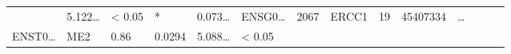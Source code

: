 \documentclass[
]{article}
\begin{document}
\begin{longtable}[]{@{}llllllllllllll@{}}
\begin{minipage}[t]{0.04\columnwidth}
\end{minipage} & \begin{minipage}[t]{0.05\columnwidth}\raggedright
5.122\ldots{}\strut
\end{minipage} & \begin{minipage}[t]{0.05\columnwidth}\raggedright
\textless{} 0.05\strut
\end{minipage} & \begin{minipage}[t]{0.03\columnwidth}\raggedright
*\strut
\end{minipage} & \begin{minipage}[t]{0.05\columnwidth}\raggedright
0.073\ldots{}\strut
\end{minipage} & \begin{minipage}[t]{0.05\columnwidth}\raggedright
ENSG0\ldots{}\strut
\end{minipage} & \begin{minipage}[t]{0.05\columnwidth}\raggedright
2067\strut
\end{minipage} & \begin{minipage}[t]{0.05\columnwidth}\raggedright
ERCC1\strut
\end{minipage} & \begin{minipage}[t]{0.05\columnwidth}\raggedright
19\strut
\end{minipage} & \begin{minipage}[t]{0.05\columnwidth}\raggedright
45407334\strut
\end{minipage} & \begin{minipage}[t]{0.02\columnwidth}\raggedright
\ldots{}\strut
\end{minipage}\tabularnewline
\begin{minipage}[t]{0.05\columnwidth}\raggedright
ENST0\ldots{}\strut
\end{minipage} & \begin{minipage}[t]{0.04\columnwidth}\raggedright
ME2\strut
\end{minipage} & \begin{minipage}[t]{0.04\columnwidth}\raggedright
0.86\strut
\end{minipage} & \begin{minipage}[t]{0.04\columnwidth}\raggedright
0.0294\strut
\end{minipage} & \begin{minipage}[t]{0.05\columnwidth}\raggedright
5.088\ldots{}\strut
\end{minipage} & \begin{minipage}[t]{0.05\columnwidth}\raggedright
\textless{} 0.05\strut

\end{minipage}
\end{longtable}
\end{document}
